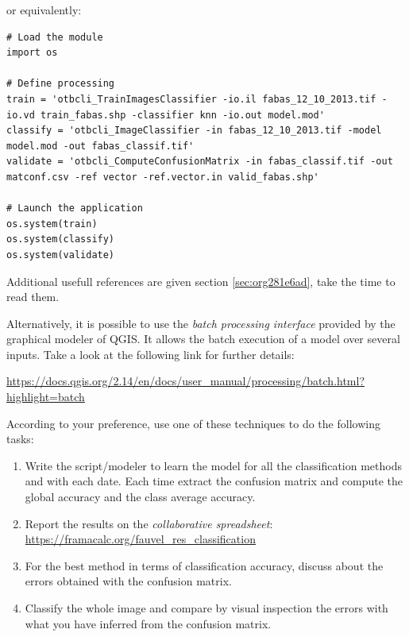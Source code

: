 \documentclass[a4paper,11pt,DIV=18]{scrartcl}
\begin{document}
or equivalently:

\begin{verbatim}
# Load the module
import os

# Define processing
train = 'otbcli_TrainImagesClassifier -io.il fabas_12_10_2013.tif -io.vd train_fabas.shp -classifier knn -io.out model.mod' 
classify = 'otbcli_ImageClassifier -in fabas_12_10_2013.tif -model model.mod -out fabas_classif.tif'
validate = 'otbcli_ComputeConfusionMatrix -in fabas_classif.tif -out matconf.csv -ref vector -ref.vector.in valid_fabas.shp'

# Launch the application
os.system(train)
os.system(classify)
os.system(validate)
\end{verbatim}

Additional usefull references are  given section \ref{sec:org281e6ad}, take the
time to read them.

Alternatively, it  is possible to  use the \emph{batch  processing interface}
provided  by the  graphical  modeler  of QGIS.   It  allows the  batch
execution of a model over several inputs. Take a look at the following
link for further details:

\begin{center}
\url{https://docs.qgis.org/2.14/en/docs/user\_manual/processing/batch.html?highlight=batch}
\end{center}

According to  your preference, use one  of these techniques to  do the
following tasks:

\begin{work}
\begin{enumerate}
\item Write  the   script/modeler  to  learn  the  model   for  all  the
classification methods and  with each date.  Each  time extract the
confusion  matrix and  compute the  global accuracy  and the  class
average accuracy.
\item Report   the   results    on   the   \emph{collaborative   spreadsheet}:
\url{https://framacalc.org/fauvel\_res\_classification}
\item For  the best method  in terms of classification  accuracy, discuss
about the errors obtained with the confusion matrix.
\item Classify the  whole image  and  compare by  visual inspection  the
errors with what you have inferred from the confusion matrix.
\end{enumerate}
\end{work}
\end{document}
